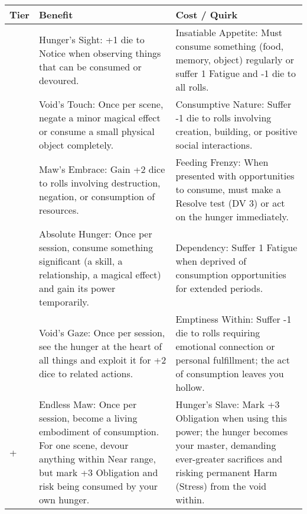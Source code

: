 \begin{longtable}{>{\raggedright\arraybackslash}p{1cm} p{5cm} p{5cm}}
\toprule
\textbf{Tier} & \textbf{Benefit} & \textbf{Cost / Quirk} \\
\midrule
1 & Hunger's Sight: +1 die to Notice when observing things that can be consumed or devoured. & Insatiable Appetite: Must consume something (food, memory, object) regularly or suffer 1 Fatigue and -1 die to all rolls. \\
\midrule
2 & Void's Touch: Once per scene, negate a minor magical effect or consume a small physical object completely. & Consumptive Nature: Suffer -1 die to rolls involving creation, building, or positive social interactions. \\
\midrule
3 & Maw's Embrace: Gain +2 dice to rolls involving destruction, negation, or consumption of resources. & Feeding Frenzy: When presented with opportunities to consume, must make a Resolve test (DV 3) or act on the hunger immediately. \\
\midrule
4 & Absolute Hunger: Once per session, consume something significant (a skill, a relationship, a magical effect) and gain its power temporarily. & Dependency: Suffer 1 Fatigue when deprived of consumption opportunities for extended periods. \\
\midrule
5 & Void's Gaze: Once per session, see the hunger at the heart of all things and exploit it for +2 dice to related actions. & Emptiness Within: Suffer -1 die to rolls requiring emotional connection or personal fulfillment; the act of consumption leaves you hollow. \\
\midrule
6+ & Endless Maw: Once per session, become a living embodiment of consumption. For one scene, devour anything within Near range, but mark +3 Obligation and risk being consumed by your own hunger. & Hunger's Slave: Mark +3 Obligation when using this power; the hunger becomes your master, demanding ever-greater sacrifices and risking permanent Harm (Stress) from the void within. \\
\bottomrule
\end{longtable}